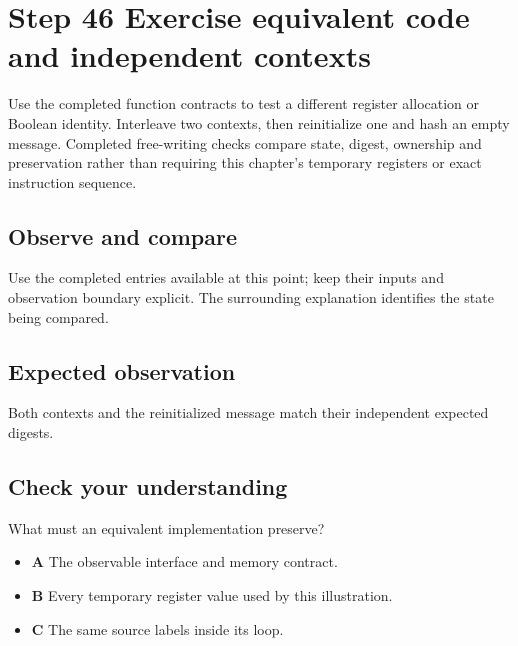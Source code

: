 \section{Step 46 Exercise equivalent code and independent contexts}\label{sha-s46}

Use the completed function contracts to test a different register allocation or Boolean identity. Interleave two contexts, then reinitialize one and hash an empty message. Completed free-writing checks compare state, digest, ownership and preservation rather than requiring this chapter's temporary registers or exact instruction sequence.

\subsection{Observe and compare}
Use the completed entries available at this point; keep their inputs and observation boundary explicit. The surrounding explanation identifies the state being compared.

\subsection{Expected observation}
Both contexts and the reinitialized message match their independent expected digests.

\subsection{Check your understanding}
What must an equivalent implementation preserve?

\begin{itemize}
  \item \textbf{A} The observable interface and memory contract.
  \item \textbf{B} Every temporary register value used by this illustration.
  \item \textbf{C} The same source labels inside its loop.
\end{itemize}
